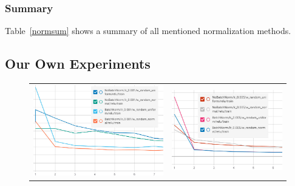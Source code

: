 \documentclass{article}
\begin{document}
\subsubsection{Summary}
Table~\ref{normsum} shows a summary of all mentioned normalization methods.

\subsection{Our Own Experiments}

\begin{figure}[!ht]
\begin{tabular}{cc}
  \includegraphics[scale=0.48]{pics/batchNorm/BatchNorm_relu_1.jpg} &
  \includegraphics[scale=0.52]{pics/batchNorm/BatchNorm_relu_5.jpg}
  \\

\end{tabular}
\end{figure}
\end{document}
